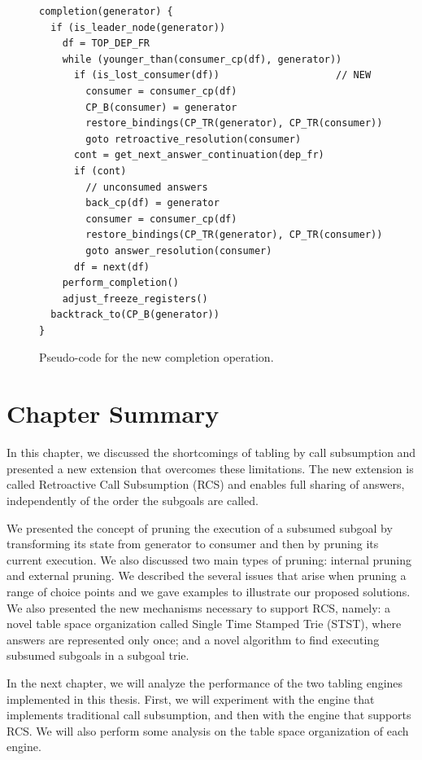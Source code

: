 \begin{figure}[ht]
\begin{Verbatim}
completion(generator) {
  if (is_leader_node(generator))
    df = TOP_DEP_FR
    while (younger_than(consumer_cp(df), generator))
      if (is_lost_consumer(df))                    // NEW
        consumer = consumer_cp(df)
        CP_B(consumer) = generator
        restore_bindings(CP_TR(generator), CP_TR(consumer))
        goto retroactive_resolution(consumer)
      cont = get_next_answer_continuation(dep_fr)
      if (cont)
        // unconsumed answers
        back_cp(df) = generator
        consumer = consumer_cp(df)
        restore_bindings(CP_TR(generator), CP_TR(consumer))
        goto answer_resolution(consumer)
      df = next(df)
    perform_completion()
    adjust_freeze_registers()
  backtrack_to(CP_B(generator))
}
\end{Verbatim}
\caption{Pseudo-code for the new completion operation.}
\label{fig:completion_operation_retro}
\end{figure}

\section{Chapter Summary}

In this chapter, we discussed the shortcomings of tabling by call subsumption and presented a
new extension that overcomes these limitations. The new extension is called Retroactive Call Subsumption (RCS)
and enables full sharing of answers, independently of the order the subgoals are called.

We presented the concept of pruning the execution of a subsumed subgoal by transforming its state from
generator to consumer and then by pruning its current execution. We also discussed two main types of pruning:
internal pruning and external pruning. We described the several issues that arise when pruning a range of
choice points and we gave examples to illustrate our proposed solutions. We also presented the new mechanisms
necessary to support RCS, namely: a novel table space organization called Single Time Stamped Trie (STST),
where answers are represented only once; and a novel algorithm to find executing subsumed subgoals in a subgoal trie.

In the next chapter, we will analyze the performance of the two tabling engines implemented in this thesis.
First, we will experiment with the engine that implements traditional call subsumption, and then
with the engine that supports RCS. We will also perform some analysis on the table space organization of each engine.
